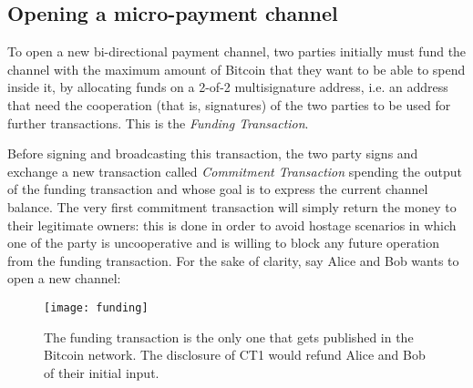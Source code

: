 		\subsection{Opening a micro-payment channel}
		
		To open a new bi-directional payment channel, two parties initially must fund the channel with the maximum amount of Bitcoin that they want to be able to spend inside it, by allocating funds on a 2-of-2 multisignature address, i.e. an address that need the cooperation (that is, signatures) of the two parties to be used for further transactions. This is the \textit{Funding Transaction}.
		
		Before signing and broadcasting this transaction, the two party signs and exchange a new transaction called \textit{Commitment Transaction} spending the output of the funding transaction and whose goal is to express the current channel balance. The very first commitment transaction will simply return the money to their legitimate owners: this is done in order to avoid hostage scenarios in which one of the party is uncooperative and is willing to block any future operation from the funding transaction. For the sake of clarity, say Alice and Bob wants to open a new channel:
		
		\begin{figure}[]
			\texttt{[image: funding]}
			\centering
			\caption{The funding transaction is the only one that gets published in the Bitcoin network. The disclosure of CT1 would refund Alice and Bob of their initial input.}
		\end{figure}
		
